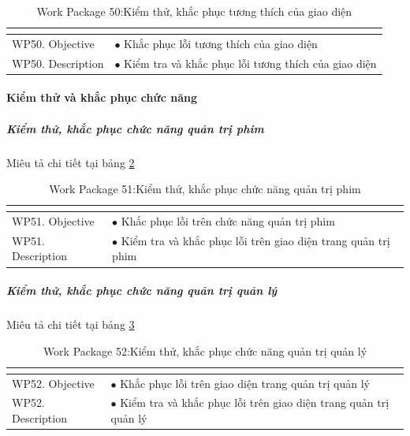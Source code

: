 \documentclass[a4paper]{book}
\begin{document}
\begin{table}[h!]
	\begin{center}
		\begin{tabular}{|p{4cm}|p{10cm}|}
			\hline
			\multicolumn{2}{|c|}{\cellcolor[HTML]{363636}{\color[HTML]{FFFFFF}Work package 50: Kiểm thử, khắc phục tương thích của giao diện}}\\
			\hline
			\multirow{1}{*}{WP50. Objective} & $\bullet$ Khắc phục lỗi tương thích của giao diện\\
			\hline
			\multirow{1}{*}{WP50. Description} & $\bullet$ Kiểm tra và khắc phục lỗi tương thích của giao diện \\
			\hline
		\end{tabular}
		\caption{Work Package 50:Kiểm thử, khắc phục tương thích của giao diện}
		\label{table:kt_kp_tuongthichcuagiaodien}
	\end{center}
\end{table}
\paragraph{Kiểm thử và khắc phục chức năng}
\subparagraph{Kiểm thử, khắc phục chức năng quản trị phim} Miêu tả chi tiết tại bảng \ref{table:kt_kp_chucnang_quantriphim}
\begin{table}[h!]
	\begin{center}
		\begin{tabular}{|p{4cm}|p{10cm}|}
			\hline
			\multicolumn{2}{|c|}{\cellcolor[HTML]{363636}{\color[HTML]{FFFFFF}Work package 51: Kiểm thử, khắc phục chức năng quản trị phim}}\\
			\hline
			\multirow{1}{*}{WP51. Objective} & $\bullet$ Khắc phục lỗi trên chức năng quản trị phim\\
			\hline
			\multirow{1}{*}{WP51. Description} & $\bullet$ Kiểm tra và khắc phục lỗi trên giao diện trang quản trị phim \\
			\hline
		\end{tabular}
		\caption{Work Package 51:Kiểm thử, khắc phục chức năng quản trị phim}
		\label{table:kt_kp_chucnang_quantriphim}
	\end{center}
\end{table}
\subparagraph{Kiểm thử, khắc phục chức năng quản trị quản lý} Miêu tả chi tiết tại bảng \ref{table:kt_kp_chucnang_quantriquanly}
\begin{table}[h!]
	\begin{center}
		\begin{tabular}{|p{4cm}|p{10cm}|}
			\hline
			\multicolumn{2}{|c|}{\cellcolor[HTML]{363636}{\color[HTML]{FFFFFF}Work package 52: Kiểm thử, khắc phục chức năng quản trị quản lý}}\\
			\hline
			\multirow{1}{*}{WP52. Objective} & $\bullet$ Khắc phục lỗi trên giao diện trang quản trị quản lý\\
			\hline
			\multirow{1}{*}{WP52. Description} & $\bullet$ Kiểm tra và khắc phục lỗi trên giao diện trang quản trị quản lý \\
			\hline
		\end{tabular}
		\caption{Work Package 52:Kiểm thử, khắc phục chức năng quản trị quản lý}
		\label{table:kt_kp_chucnang_quantriquanly}
	\end{center}
\end{table}
\end{document}
